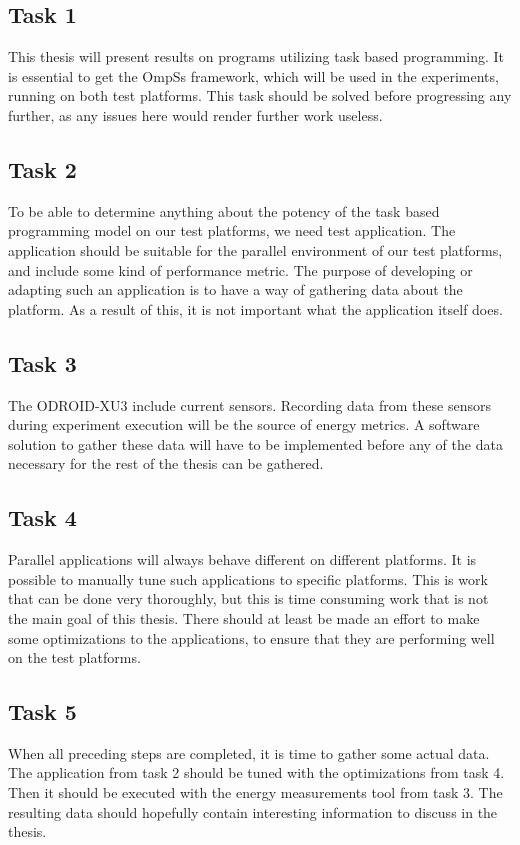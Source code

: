 \subsection{Task 1}
This thesis will present results on programs utilizing task based programming.
It is essential to get the OmpSs framework, which will be used in the experiments, running on both test platforms.
This task should be solved before progressing any further, as any issues here would render further work useless.

\subsection{Task 2}
To be able to determine anything about the potency of the task based programming model on our test platforms, we need test application.
The application should be suitable for the parallel environment of our test platforms, and include some kind of performance metric.
The purpose of developing or adapting such an application is to have a way of gathering data about the platform.
As a result of this, it is not important what the application itself does.

\subsection{Task 3}
The ODROID-XU3 include current sensors.
Recording data from these sensors during experiment execution will be the source of energy metrics.
A software solution to gather these data will have to be implemented before any of the data necessary for the rest of the thesis can be gathered.

\subsection{Task 4}
Parallel applications will always behave different on different platforms.
It is possible to manually tune such applications to specific platforms.
This is work that can be done very thoroughly, but this is time consuming work that is not the main goal of this thesis.
There should at least be made an effort to make some optimizations to the applications, to ensure that they are performing well on the test platforms.

\subsection{Task 5}
When all preceding steps are completed, it is time to gather some actual data.
The application from task 2 should be tuned with the optimizations from task 4.
Then it should be executed with the energy measurements tool from task 3.
The resulting data should hopefully contain interesting information to discuss in the thesis.

